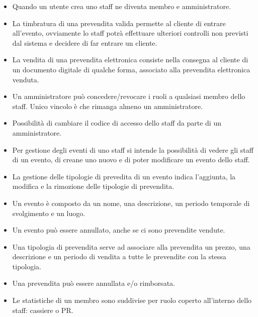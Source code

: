 \documentclass[a4paper]{article}
\begin{document}
\begin{itemize}
	\item Quando un utente crea uno staff ne diventa membro e amministratore.
	
	\item La timbratura di una prevendita valida permette al cliente di entrare all'evento, ovviamente lo staff potrà effettuare ulteriori controlli non previsti dal sistema e decidere di far entrare un cliente.
	
	
	\item La vendita di una prevendita elettronica consiste nella consegna al cliente di un documento digitale di qualche forma, associato alla prevendita elettronica venduta.

	
	\item Un amministratore può concedere/revocare i ruoli a qualsiasi membro dello staff. Unico vincolo è che rimanga almeno un amministratore.
	\item Possibilità di cambiare il codice di accesso dello staff da parte di un amministratore.
	   
	\item Per gestione degli eventi di uno staff si intende la possibilità di vedere gli staff di un evento, di creane uno nuovo e di poter modificare un evento dello staff.
		
	\item La gestione delle tipologie di prevedita di un evento indica l'aggiunta, la modifica e la rimozione delle tipologie di prevendita.
	
	\item Un evento è composto da un nome, una descrizione, un periodo temporale di svolgimento e un luogo. 
	\item Un evento può essere annullato, anche se ci sono prevendite vendute.
	
	\item Una tipologia di prevendita serve ad associare alla prevendita un prezzo, una descrizione e un periodo di vendita a tutte le prevendite con la stessa tipologia.

	\item Una prevendita può essere annullata e/o rimborsata. 
	
	\item Le statistiche di un membro sono suddivise per ruolo coperto all'interno dello staff: cassiere o PR.
	

\end{itemize}
\end{document}
